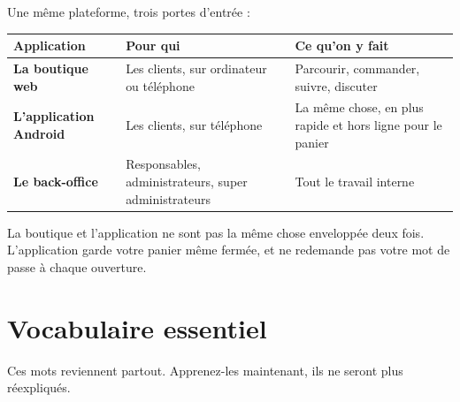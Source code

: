 \documentclass[11pt,a4paper]{report}
\begin{document}
Une même plateforme, trois portes d'entrée :

\begin{center}
\begin{tabular}{@{}>{\bfseries}p{3.4cm} p{4.6cm} p{6.2cm}@{}}
\toprule
Application & Pour qui & Ce qu'on y fait \\
\midrule
La boutique web
  & Les clients, sur ordinateur ou téléphone
  & Parcourir, commander, suivre, discuter \\[4pt]
L'application Android
  & Les clients, sur téléphone
  & La même chose, en plus rapide et hors ligne pour le panier \\[4pt]
Le back-office
  & Responsables, administrateurs, super administrateurs
  & Tout le travail interne \\
\bottomrule
\end{tabular}
\end{center}

\begin{astuce}
La boutique et l'application ne sont pas la même chose enveloppée deux fois.
L'application garde votre panier même fermée, et ne redemande pas votre mot de
passe à chaque ouverture.
\end{astuce}

\section{Vocabulaire essentiel}

Ces mots reviennent partout. Apprenez-les maintenant, ils ne seront plus
réexpliqués.
\end{document}
